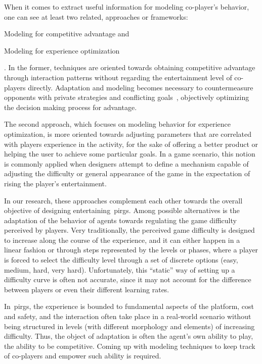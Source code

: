 When it comes to extract useful information for modeling co-player's behavior, one can see at least two related, approaches or frameworks: \begin{inparaenum}\item Modeling for competitive advantage and \item Modeling for experience optimization\end{inparaenum}. In the former, techniques are oriented towards obtaining competitive advantage through interaction patterns without regarding the entertainment level of co-players directly. Adaptation and modeling becomes necessary to countermeasure opponents with private strategies and conflicting goals~\citep{rofer_overview_2012}, objectively optimizing the decision making process for advantage.

The second approach, which focuses on modeling behavior for experience optimization, is more oriented towards adjusting parameters that are correlated with players experience in the activity, for the sake of offering a better product or helping the user to achieve some particular goals. In a game scenario, this notion is commonly applied when designers attempt to define a mechanism capable of adjusting the difficulty or general appearance of the game in the expectation of rising the player's entertainment.

In our research, these approaches complement each other towards the overall objective of designing entertaining~\glspl{pirg}. Among possible alternatives is the adaptation of the behavior of agents towards regulating the game difficulty perceived by players. Very traditionally, the perceived game difficulty is designed to increase along the course of the experience, and it can either happen in a linear fashion or through steps represented by the levels or phases, where a player is forced to select the difficulty level through a set of discrete options (easy, medium, hard, very hard). Unfortunately, this ``static'' way of setting up a difficulty curve is often not accurate, since it may not account for the difference between players or even their different learning rates.

In~\glspl{pirg}, the experience is bounded to fundamental aspects of the platform, \eg cost and safety, and the interaction often take place in a real-world scenario without being structured in levels (with different morphology and elements) of increasing difficulty. Thus, the object of adaptation is often the agent's own ability to play, \ie the ability to be competitive. Coming up with modeling techniques to keep track of co-players and empower such ability is required.

